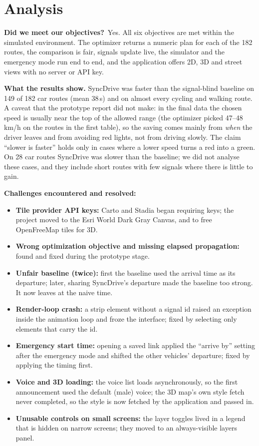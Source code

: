\documentclass[12pt,a4paper]{report}
\begin{document}
\section{Analysis}

\textbf{Did we meet our objectives?}\ Yes. All six objectives are met within
the simulated environment. The optimizer returns a numeric plan for each of the
182 routes, the comparison is fair, signals update live, the simulator and the
emergency mode run end to end, and the application offers 2D, 3D and street
views with no server or API key.

\textbf{What the results show.} SyncDrive was faster than the signal-blind
baseline on 149 of 182 car routes (mean 38\,s) and on almost every cycling and
walking route. A caveat that the prototype report did not make: in the final
data the chosen speed is usually near the top of the allowed range (the optimizer
picked 47--48\,km/h on the routes in the first table), so the saving comes
mainly from \textit{when} the driver leaves and from avoiding red lights, not
from driving slowly. The claim ``slower is faster'' holds only in cases where a
lower speed turns a red into a green. On 28 car routes SyncDrive was slower than
the baseline; we did not analyse these cases, and they include short routes
with few signals where there is little to gain.

\textbf{Challenges encountered and resolved:}

\begin{itemize}
  \item \textbf{Tile provider API keys:} Carto and Stadia began requiring
        keys; the project moved to the Esri World Dark Gray Canvas, and to free
        OpenFreeMap tiles for 3D.
  \item \textbf{Wrong optimization objective and missing elapsed propagation:}
        found and fixed during the prototype stage.
  \item \textbf{Unfair baseline (twice):} first the baseline used the arrival
        time as its departure; later, sharing SyncDrive's departure made the
        baseline too strong. It now leaves at the naive time.
  \item \textbf{Render-loop crash:} a strip element without a signal id raised
        an exception inside the animation loop and froze the interface; fixed
        by selecting only elements that carry the id.
  \item \textbf{Emergency start time:} opening a saved link applied the
        ``arrive by'' setting after the emergency mode and shifted the other
        vehicles' departure; fixed by applying the timing first.
  \item \textbf{Voice and 3D loading:} the voice list loads asynchronously, so
        the first announcement used the default (male) voice; the 3D map's own
        style fetch never completed, so the style is now fetched by the
        application and passed in.
  \item \textbf{Unusable controls on small screens:} the layer toggles lived in
        a legend that is hidden on narrow screens; they moved to an
        always-visible layers panel.
\end{itemize}
\end{document}
